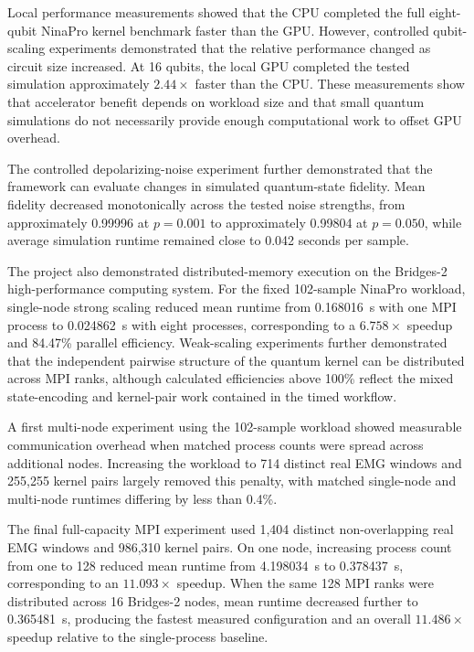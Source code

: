 \documentclass[pdflatex,sn-mathphys-num]{sn-jnl}%
\theoremstyle{thmstyleone}%
\theoremstyle{thmstyletwo}%
\theoremstyle{thmstylethree}%
\begin{document}
Local performance measurements showed that the CPU completed the full
eight-qubit NinaPro kernel benchmark faster than the GPU. However, controlled
qubit-scaling experiments demonstrated that the relative performance changed as
circuit size increased. At 16 qubits, the local GPU completed the tested
simulation approximately $2.44\times$ faster than the CPU. These measurements
show that accelerator benefit depends on workload size and that small quantum
simulations do not necessarily provide enough computational work to offset GPU
overhead.

The controlled depolarizing-noise experiment further demonstrated that the
framework can evaluate changes in simulated quantum-state fidelity. Mean
fidelity decreased monotonically across the tested noise strengths, from
approximately 0.99996 at $p=0.001$ to approximately 0.99804 at $p=0.050$,
while average simulation runtime remained close to 0.042 seconds per sample.

The project also demonstrated distributed-memory execution on the Bridges-2
high-performance computing system. For the fixed 102-sample NinaPro workload,
single-node strong scaling reduced mean runtime from 0.168016~s with one MPI
process to 0.024862~s with eight processes, corresponding to a
\(6.758\times\) speedup and 84.47\% parallel efficiency. Weak-scaling
experiments further demonstrated that the independent pairwise structure of
the quantum kernel can be distributed across MPI ranks, although calculated
efficiencies above 100\% reflect the mixed state-encoding and kernel-pair work
contained in the timed workflow.

A first multi-node experiment using the 102-sample workload showed measurable
communication overhead when matched process counts were spread across
additional nodes. Increasing the workload to 714 distinct real EMG windows and
255,255 kernel pairs largely removed this penalty, with matched single-node
and multi-node runtimes differing by less than 0.4\%.

The final full-capacity MPI experiment used 1,404 distinct non-overlapping
real EMG windows and 986,310 kernel pairs. On one node, increasing process
count from one to 128 reduced mean runtime from 4.198034~s to 0.378437~s,
corresponding to an \(11.093\times\) speedup. When the same 128 MPI ranks
were distributed across 16 Bridges-2 nodes, mean runtime decreased further
to 0.365481~s, producing the fastest measured configuration and an overall
\(11.486\times\) speedup relative to the single-process baseline.
\end{document}
